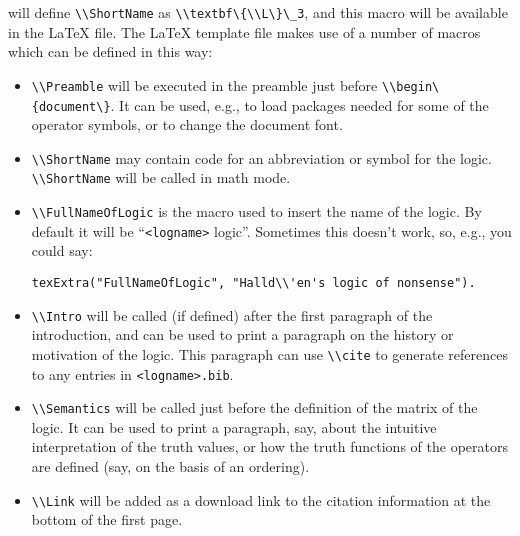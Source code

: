 \documentclass[
]{article}
\newcommand{\passthrough}[1]{#1}
\begin{document}
\begin{itemize}
  will define \passthrough{\lstinline!\\ShortName!} as
  \passthrough{\lstinline!\\textbf\{\\L\}\_3!}, and this macro will be
  available in the LaTeX file. The LaTeX template file makes use of a
  number of macros which can be defined in this way:

  \begin{itemize}
  \item
    \passthrough{\lstinline!\\Preamble!} will be executed in the
    preamble just before \passthrough{\lstinline!\\begin\{document\}!}.
    It can be used, e.g., to load packages needed for some of the
    operator symbols, or to change the document font.
  \item
    \passthrough{\lstinline!\\ShortName!} may contain code for an
    abbreviation or symbol for the logic.
    \passthrough{\lstinline!\\ShortName!} will be called in math mode.
  \item
    \passthrough{\lstinline!\\FullNameOfLogic!} is the macro used to
    insert the name of the logic. By default it will be
    ``\passthrough{\lstinline!<logname>!} logic''. Sometimes this
    doesn't work, so, e.g., you could say:

\begin{lstlisting}
texExtra("FullNameOfLogic", "Halld\\'en's logic of nonsense").
\end{lstlisting}
  \item
    \passthrough{\lstinline!\\Intro!} will be called (if defined) after
    the first paragraph of the introduction, and can be used to print a
    paragraph on the history or motivation of the logic. This paragraph
    can use \passthrough{\lstinline!\\cite!} to generate references to
    any entries in \passthrough{\lstinline!<logname>.bib!}.
  \item
    \passthrough{\lstinline!\\Semantics!} will be called just before the
    definition of the matrix of the logic. It can be used to print a
    paragraph, say, about the intuitive interpretation of the truth
    values, or how the truth functions of the operators are defined
    (say, on the basis of an ordering).
  \item
    \passthrough{\lstinline!\\Link!} will be added as a download link to
    the citation information at the bottom of the first page.
  \end{itemize}
\end{itemize}
\end{document}
